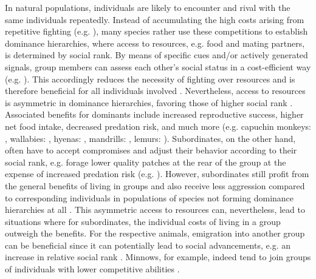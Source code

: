 \documentclass[11pt,pdftex]{article}
\begin{document}
In natural populations, individuals are likely to encounter and rival with the same individuals repeatedly. Instead of accumulating the high costs arising from repetitive fighting (e.g. \citealp{Briffa2004}), many species rather use these competitions to establish dominance hierarchies, where access to resources, e.g. food and mating partners, is determined by social rank. By means of specific cues and/or actively generated signals, group members can assess each other's social status in a cost-efficient way (e.g. \citealp{Cluttonbrock1979, Fernald2014, Cornhill2020}). This accordingly reduces the necessity of fighting over resources and is therefore beneficial for all individuals involved \citep{Cluttonbrock1979, Janson1985, Creel1996}. Nevertheless, access to resources is asymmetric in dominance hierarchies, favoring those of higher social rank \citep{Janson1985, Wauters1992, Sapolsky2005, Taves2009}. Associated benefits for dominants include increased reproductive success, higher net food intake, decreased predation risk, and much more (e.g. capuchin monkeys: \citealp{Janson1985, Jason1990}, wallabies: \citealp{Blumstein2001}, hyenas: \citealp{Engh2002}, mandrills: \citealp{Charpentier2005}, lemurs: \citealp{Kappeler2008}). Subordinates, on the other hand, often have to accept compromises and adjust their behavior according to their social rank, e.g. forage lower quality patches at the rear of the group at the expense of increased predation risk (e.g. \citealp{Jason1990}). However, subordinates still profit from the general benefits of living in groups and also receive less aggression compared to corresponding individuals in populations of species not forming dominance hierarchies at all \citep{Sapolsky2005}. This asymmetric access to resources can, nevertheless, lead to situations where for subordinates, the individual costs of living in a group outweigh the benefits. For the respective animals, emigration into another group can be beneficial since it can potentially lead to social advancements, e.g. an increase in relative social rank \citep{Janson1985, Chapman1995, Markham2017}. Minnows, for example, indeed tend to join groups of individuals with lower competitive abilities \citep{Metcalfe1995}.
\end{document}
